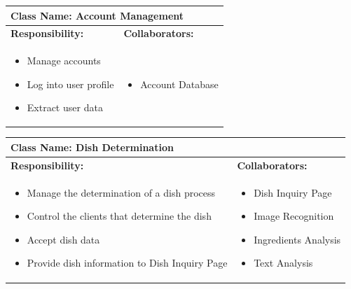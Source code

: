 \documentclass[]{article}
\begin{document}
\begin{table}[H]
	\centering
	\begin{tabular}{|p{7cm}|p{7cm}|}
	\hline 
	 \multicolumn{2}{|l|}{\textbf{Class Name: Account Management}} \\
	\hline
	\textbf{Responsibility:} & \textbf{Collaborators:} \\
	\hline
	\raggedright
	\begin{itemize}
		\item Manage accounts
		\item Log into user profile
		\item Extract user data
	\end{itemize}
	\vspace{1in} & 
	\begin{itemize}
		\item Account Database
	\end{itemize} \\
	\hline
	\end{tabular}
\end{table}

\begin{table}[H]
	\centering
	\begin{tabular}{|p{7cm}|p{7cm}|}
	\hline 
	 \multicolumn{2}{|l|}{\textbf{Class Name: Dish Determination}} \\
	\hline
	\textbf{Responsibility:} & \textbf{Collaborators:} \\
	\hline
	\raggedright
	\begin{itemize}
		\item Manage the determination of a dish process
		\item Control the clients that determine the dish
		\item Accept dish data
		\item Provide dish information to Dish Inquiry Page
	\end{itemize}
	\vspace{1in} & 
	\begin{itemize}
		\item Dish Inquiry Page
		\item Image Recognition
		\item Ingredients Analysis
		\item Text Analysis
	\end{itemize} \\
	\hline
	\end{tabular}
\end{table}
\end{document}
